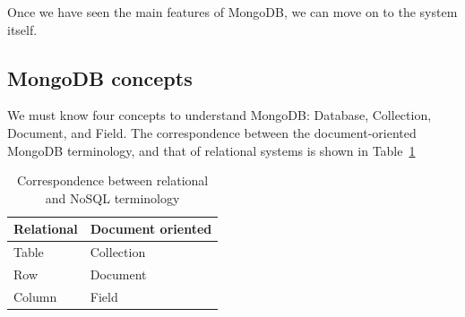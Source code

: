 Once we have seen the main features of MongoDB, we can move on to the 
system %
itself.



\subsection{MongoDB concepts} %
\label{sub:mongodb_concepts}

We must know four concepts to understand MongoDB: Database, Collection, Document, and Field. The correspondence between the document-oriented MongoDB terminology, and that of relational systems is shown in
Table~\ref{tab:relationalvsdocument}




\begin{table}
\begin{center}
\begin{tabular}{ll} %
\textbf{Relational} & \textbf{Document oriented} \\ \midrule[2pt]
Table & Collection\\ \midrule %
Row & Document\\ \midrule %
Column & Field \\
\end{tabular}
\end{center}
\caption{Correspondence between relational and NoSQL terminology}
\label{tab:relationalvsdocument}
\end{table}



